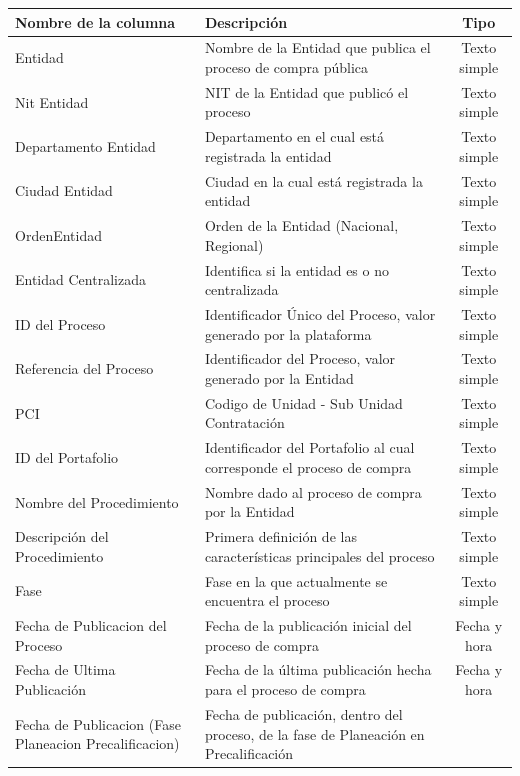 \documentclass[11pt,letterpaper,oneside]{article}
\begin{document}
	\begin{table}[!htp]
		\tiny 
		\centering
		\begin{tabular}{|p{3cm}|p{6.5cm}|c|}
		\hline
		\textbf{Nombre de la columna} & \textbf{Descripción} & \textbf{Tipo} \\
		\hline
		Entidad	&
		Nombre de la Entidad que publica el proceso de compra pública &
		Texto simple \\ \hline
		Nit Entidad &	
		NIT de la Entidad que publicó el proceso &
		Texto simple \\ \hline
		Departamento Entidad &	
		Departamento en el cual está registrada la entidad &
		Texto simple \\ \hline
		Ciudad Entidad &	
		Ciudad en la cual está registrada la entidad &
		Texto simple \\ \hline
		OrdenEntidad &	
		Orden de la Entidad (Nacional, Regional) &
		Texto simple \\ \hline
		Entidad Centralizada &	
		Identifica si la entidad es o no centralizada &
		Texto simple \\ \hline
		ID del Proceso &	
		Identificador Único del Proceso, valor generado por la plataforma &
		Texto simple \\ \hline
		Referencia del Proceso &	
		Identificador del Proceso, valor generado por la Entidad &
		Texto simple \\ \hline
		PCI &	
		Codigo de Unidad - Sub Unidad Contratación &
		Texto simple \\ \hline
		ID del Portafolio &	
		Identificador del Portafolio al cual corresponde el proceso de compra &
		Texto simple \\ \hline
		Nombre del Procedimiento &	
		Nombre dado al proceso de compra por la Entidad &
		Texto simple \\ \hline
		Descripción del Procedimiento &	
		Primera definición de las características principales del proceso &
		Texto simple \\ \hline
		Fase &	
		Fase en la que actualmente se encuentra el proceso &
		Texto simple \\ \hline
		Fecha de Publicacion del Proceso &	
		Fecha de la publicación inicial del proceso de compra &
		Fecha y hora \\ \hline
		Fecha de Ultima Publicación &	
		Fecha de la última publicación hecha para el proceso de compra &
		Fecha y hora \\ \hline
		Fecha de Publicacion (Fase Planeacion Precalificacion) &	
		Fecha de publicación, dentro del proceso, de la fase de Planeación en Precalificación &

\end{tabular}
\end{table}
\end{document}
